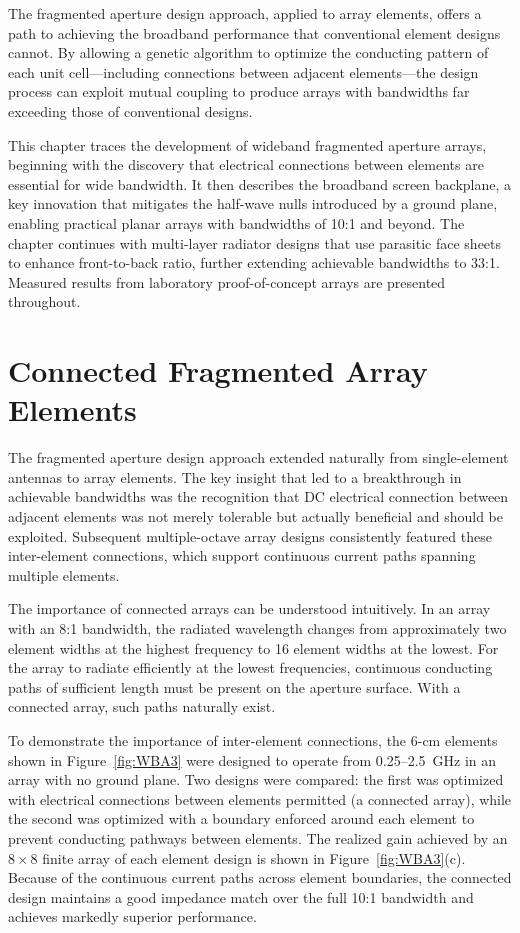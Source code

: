 The fragmented aperture design approach, applied to array elements, offers a path to achieving the broadband performance that conventional element designs cannot.  By allowing a genetic algorithm to optimize the conducting pattern of each unit cell---including connections between adjacent elements---the design process can exploit mutual coupling to produce arrays with bandwidths far exceeding those of conventional designs.

This chapter traces the development of wideband fragmented aperture arrays, beginning with the discovery that electrical connections between elements are essential for wide bandwidth.  It then describes the broadband screen backplane, a key innovation that mitigates the half-wave nulls introduced by a ground plane, enabling practical planar arrays with bandwidths of 10:1 and beyond.  The chapter continues with multi-layer radiator designs that use parasitic face sheets to enhance front-to-back ratio, further extending achievable bandwidths to 33:1.  Measured results from laboratory proof-of-concept arrays are presented throughout.

\section{Connected Fragmented Array Elements}

The fragmented aperture design approach extended naturally from single-element antennas to array elements.  The key insight that led to a breakthrough in achievable bandwidths was the recognition that DC electrical connection between adjacent elements was not merely tolerable but actually beneficial and should be exploited.  Subsequent multiple-octave array designs consistently featured these inter-element connections, which support continuous current paths spanning multiple elements.

The importance of connected arrays can be understood intuitively.  In an array with an 8:1 bandwidth, the radiated wavelength changes from approximately two element widths at the highest frequency to 16 element widths at the lowest.  For the array to radiate efficiently at the lowest frequencies, continuous conducting paths of sufficient length must be present on the aperture surface.  With a connected array, such paths naturally exist.

To demonstrate the importance of inter-element connections, the 6-cm elements shown in Figure~\ref{fig:WBA3} were designed to operate from 0.25--2.5~GHz in an array with no ground plane.  Two designs were compared: the first was optimized with electrical connections between elements permitted (a connected array), while the second was optimized with a boundary enforced around each element to prevent conducting pathways between elements.  The realized gain achieved by an $8 \times 8$ finite array of each element design is shown in Figure~\ref{fig:WBA3}(c).  Because of the continuous current paths across element boundaries, the connected design maintains a good impedance match over the full 10:1 bandwidth and achieves markedly superior performance.

